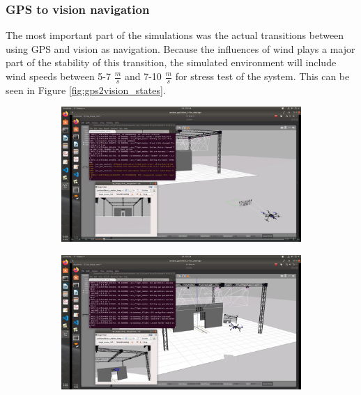 \documentclass[../Head/report.tex]{subfiles}
\begin{document}
\subsubsection{GPS to vision navigation}
\label{sec:gps2vision_transition}

The most important part of the simulations was the actual transitions between using GPS and vision as navigation. Because the influences of wind plays a major part of the stability of this transition, the simulated environment will include wind speeds between 5-7 $\frac{m}{s}$ and 7-10 $\frac{m}{s}$ for stress test of the system. This can be seen in Figure \ref{fig:gps2vision_states}. 

\begin{figure}[H]
    \centering
    \begin{subfigure}[t]{.30\textwidth}
        \centering
        \includegraphics[width=\textwidth]{../Figures/GPS2Vision/drone_start_pose_gps.png}
        \caption{}
        \label{fig:gps2vision_gps}
    \end{subfigure}
     \hspace{0.2em}
    \begin{subfigure}[t]{.30\textwidth}
        \centering
        \includegraphics[width=\textwidth]{../Figures/GPS2Vision/drone_locate_board.png}

\end{subfigure}
\end{figure}
\end{document}
